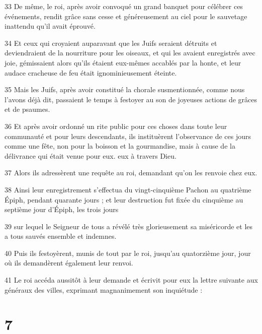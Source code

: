 \par 33 De même, le roi, après avoir convoqué un grand banquet pour célébrer ces événements, rendit grâce sans cesse et généreusement au ciel pour le sauvetage inattendu qu'il avait éprouvé.
\par 34 Et ceux qui croyaient auparavant que les Juifs seraient détruits et deviendraient de la nourriture pour les oiseaux, et qui les avaient enregistrés avec joie, gémissaient alors qu'ils étaient eux-mêmes accablés par la honte, et leur audace cracheuse de feu était ignominieusement éteinte.
\par 35 Mais les Juifs, après avoir constitué la chorale susmentionnée, comme nous l'avons déjà dit, passaient le temps à festoyer au son de joyeuses actions de grâces et de psaumes.
\par 36 Et après avoir ordonné un rite public pour ces choses dans toute leur communauté et pour leurs descendants, ils instituèrent l'observance de ces jours comme une fête, non pour la boisson et la gourmandise, mais à cause de la délivrance qui était venue pour eux. eux à travers Dieu.
\par 37 Alors ils adressèrent une requête au roi, demandant qu'on les renvoie chez eux.
\par 38 Ainsi leur enregistrement s'effectua du vingt-cinquième Pachon au quatrième Épiph, pendant quarante jours ; et leur destruction fut fixée du cinquième au septième jour d'Épiph, les trois jours
\par 39 sur lequel le Seigneur de tous a révélé très glorieusement sa miséricorde et les a tous sauvés ensemble et indemnes.
\par 40 Puis ils festoyèrent, munis de tout par le roi, jusqu'au quatorzième jour, jour où ils demandèrent également leur renvoi.
\par 41 Le roi accéda aussitôt à leur demande et écrivit pour eux la lettre suivante aux généraux des villes, exprimant magnanimement son inquiétude :

\chapter{7}

